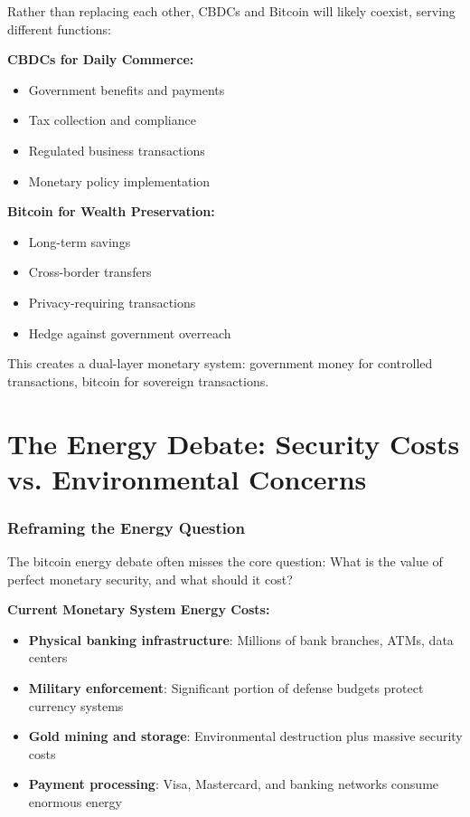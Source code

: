 \documentclass[11pt,oneside]{book}
\begin{document}
Rather than replacing each other, CBDCs and Bitcoin will likely coexist, serving different functions:

\textbf{CBDCs for Daily Commerce:}
\begin{itemize}
\item Government benefits and payments
\item Tax collection and compliance
\item Regulated business transactions
\item Monetary policy implementation
\end{itemize}

\textbf{Bitcoin for Wealth Preservation:}
\begin{itemize}
\item Long-term savings
\item Cross-border transfers
\item Privacy-requiring transactions
\item Hedge against government overreach
\end{itemize}

This creates a dual-layer monetary system: government money for controlled transactions, bitcoin for sovereign transactions.

\section{The Energy Debate: Security Costs vs. Environmental Concerns}

\subsubsection{Reframing the Energy Question}

The bitcoin energy debate often misses the core question: What is the value of perfect monetary security, and what should it cost?

\textbf{Current Monetary System Energy Costs:}
\begin{itemize}
\item \textbf{Physical banking infrastructure}: Millions of bank branches, ATMs, data centers
\item \textbf{Military enforcement}: Significant portion of defense budgets protect currency systems
\item \textbf{Gold mining and storage}: Environmental destruction plus massive security costs
\item \textbf{Payment processing}: Visa, Mastercard, and banking networks consume enormous energy
\end{itemize}
\end{document}
